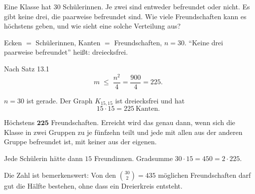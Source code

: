 \begin{aufgabe}
Eine Klasse hat $30$ Schülerinnen. Je zwei sind entweder befreundet oder nicht. Es gibt keine drei, die paarweise befreundet sind. Wie viele Freundschaften kann es höchstens geben, und wie sieht eine solche Verteilung aus?

\loesung
{}
Ecken $=$ Schülerinnen, Kanten $=$ Freundschaften, $n = 30$. \enquote{Keine drei paarweise befreundet} heißt: dreiecksfrei.

Nach Satz 13.1
\[ m \;\le\; \frac{n^2}{4} = \frac{900}{4} = 225 . \]

$n = 30$ ist gerade. Der Graph $K_{15,15}$ ist dreiecksfrei und hat
\[ 15 \cdot 15 = 225 \ \text{Kanten}. \]

Höchstens $\mathbf{225}$ Freundschaften. Erreicht wird das genau dann, wenn sich die Klasse in zwei Gruppen zu je fünfzehn teilt und jede mit allen aus der anderen Gruppe befreundet ist, mit keiner aus der eigenen.

Jede Schülerin hätte dann $15$ Freundinnen. Gradsumme $30 \cdot 15 = 450 = 2 \cdot 225$. \checkmark

Die Zahl ist bemerkenswert: Von den $\binom{30}{2} = 435$ möglichen Freundschaften darf gut die Hälfte bestehen, ohne dass ein Dreierkreis entsteht.
\end{aufgabe}

